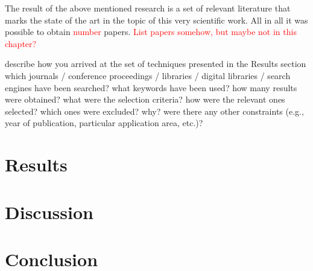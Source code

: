\documentclass[12pt,a4paper,titlepage,oneside]{scrartcl}
\newcommand\todo[1]{\textcolor{red}{#1}}
\begin{document}
The result of the above mentioned research is a set of relevant literature that marks the state of the art in the topic of this very scientific work.
All in all it was possible to obtain \todo{number} papers.
\todo{List papers somehow, but maybe not in this chapter?}

describe how you arrived at the set of techniques presented in the Results section
which journals / conference proceedings / libraries / digital libraries / search engines have been searched?
what keywords have been used?
how many results were obtained?
what were the selection criteria? how were the relevant ones selected?
which ones were excluded? why?
were there any other constraints (e.g., year of publication, particular application area, etc.)?

\section{Results}
\newpage
\section{Discussion}
\newpage
\section{Conclusion}
\newpage




\end{document}
